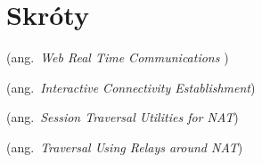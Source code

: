 % 
\chapter*{Skróty}
\label{sec:skroty}
\noindent\vspace{-\topsep-\partopsep-\parsep} %
\begin{description}[labelwidth=*]
  \item [WebRTC] (ang.\ \emph{Web Real Time Communications })
  \item [ICE] (ang.\ \emph{Interactive Connectivity Establishment})
  \item [STUN] (ang.\ \emph{Session Traversal Utilities for NAT})
  \item [TURN] (ang.\ \emph{Traversal Using Relays around NAT})
\end{description}
